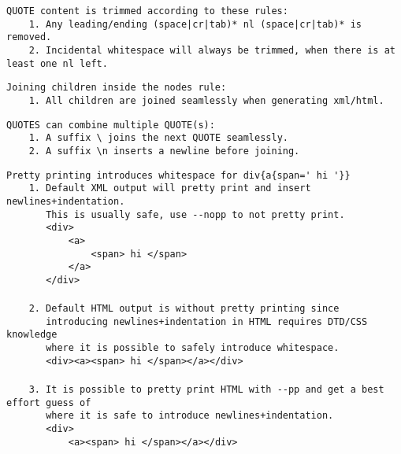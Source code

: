\documentclass[10pt,a4paper]{article}
\begin{document}
\vspace{5mm}

\verb|QUOTE content is trimmed according to these rules:|\\
\verb!    1. Any leading/ending (space|cr|tab)* nl (space|cr|tab)* is removed.! \\
\verb|    2. Incidental whitespace will always be trimmed, when there is at least one nl left.|

\vspace{5mm}

\verb|Joining children inside the nodes rule:|\\
\verb|    1. All children are joined seamlessly when generating xml/html.|\\

\vspace{5mm}

\verb|QUOTES can combine multiple QUOTE(s):|\\
\verb|    1. A suffix \ joins the next QUOTE seamlessly.|\\
\verb|    2. A suffix \n inserts a newline before joining.|

\vspace{5mm}

\verb|Pretty printing introduces whitespace for div{a{span=' hi '}}|\\
\verb|    1. Default XML output will pretty print and insert newlines+indentation.|\\
\verb|       This is usually safe, use --nopp to not pretty print.|\\
\verb|       <div>|\\
\verb|           <a>|\\
\verb|               <span> hi </span>|\\
\verb|           </a>|\\
\verb|       </div>|\\
\\
\verb|    2. Default HTML output is without pretty printing since|\\
\verb|       introducing newlines+indentation in HTML requires DTD/CSS knowledge|\\
\verb|       where it is possible to safely introduce whitespace.|\\
\verb|       <div><a><span> hi </span></a></div>|\\
\\
\verb|    3. It is possible to pretty print HTML with --pp and get a best effort guess of|\\
\verb|       where it is safe to introduce newlines+indentation.|\\
\verb|       <div>|\\
\verb|           <a><span> hi </span></a></div>|\\
\end{document}

